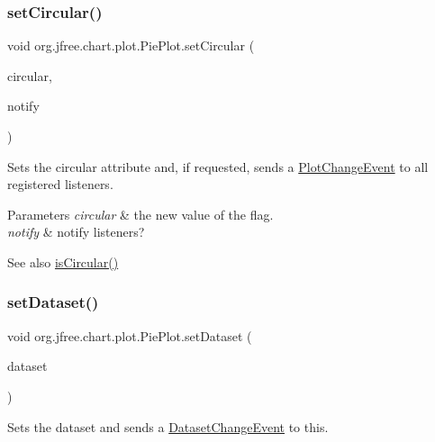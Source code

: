 \subsubsection{\texorpdfstring{set\+Circular()}{setCircular()}\hspace{0.1cm}{\footnotesize\ttfamily [2/2]}}
{\footnotesize\ttfamily void org.\+jfree.\+chart.\+plot.\+Pie\+Plot.\+set\+Circular (\begin{DoxyParamCaption}\item[{boolean}]{circular,  }\item[{boolean}]{notify }\end{DoxyParamCaption})}

Sets the circular attribute and, if requested, sends a \mbox{\hyperlink{}{Plot\+Change\+Event}} to all registered listeners.


\begin{DoxyParams}{Parameters}
{\em circular} & the new value of the flag. \\
\hline
{\em notify} & notify listeners?\\
\hline
\end{DoxyParams}
\begin{DoxySeeAlso}{See also}
\mbox{\hyperlink{classorg_1_1jfree_1_1chart_1_1plot_1_1_pie_plot_aa2b4ed17a7951f9b1fa4ca48c78a259b}{is\+Circular()}} 
\end{DoxySeeAlso}
\mbox{\label{classorg_1_1jfree_1_1chart_1_1plot_1_1_pie_plot_a2be3213da3debc6defe8e1ab9f531194}} 
\subsubsection{\texorpdfstring{set\+Dataset()}{setDataset()}}
{\footnotesize\ttfamily void org.\+jfree.\+chart.\+plot.\+Pie\+Plot.\+set\+Dataset (\begin{DoxyParamCaption}\item[{\mbox{\hyperlink{interfaceorg_1_1jfree_1_1data_1_1general_1_1_pie_dataset}{Pie\+Dataset}}}]{dataset }\end{DoxyParamCaption})}

Sets the dataset and sends a \mbox{\hyperlink{}{Dataset\+Change\+Event}} to \textquotesingle{}this\textquotesingle{}.


